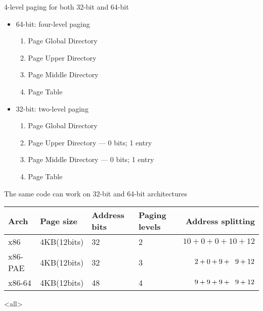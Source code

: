 \begin{frame}%
  \begin{iblock}{4-level paging for both 32-bit and 64-bit}
    \begin{itemize}
    \item \alert{64-bit: four-level paging}
      \begin{enumerate}
      \item Page Global Directory
      \item Page Upper Directory
      \item Page Middle Directory
      \item Page Table
      \end{enumerate}
    \item \alert{32-bit: two-level paging}
      \begin{enumerate}
      \item Page Global Directory
      \item Page Upper Directory --- 0 bits; 1 entry
      \item Page Middle Directory --- 0 bits; 1 entry
      \item Page Table
      \end{enumerate}
    \end{itemize}
    \alert{The same code can work on 32-bit and 64-bit architectures}
  \end{iblock}
    \begin{center}
    \begin{scriptsize}
      \begin{tabular}{llm{3em}m{3em}r}
        \hline
        Arch&Page size&Address bits&Paging levels&Address splitting\\\hline
        x86 &4KB(12bits) &32 &2 &$10+0+0+10+12$\\
        x86-PAE&4KB(12bits)&32&3&$2+0+9+\hspace{.6em}9+12$\\
        x86-64&4KB(12bits)&48&4&$9+9+9+\hspace{.6em}9+12$\\\hline
      \end{tabular}
    \end{scriptsize}
  \end{center}
\end{frame}

\begin{frame}
  \begin{refsection}
    \nocite{wiki:mm, wiki:vm}
    \printbibliography[heading=none]
  \end{refsection}
\end{frame}

\mode<all>
